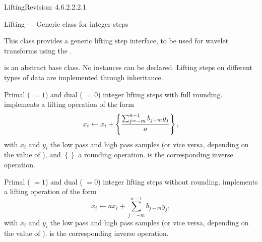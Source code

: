 \begin{manpage}{\libtitle}{Lifting}{$ $Revision: 4.6.2.2.2.1 $ $}

\subtitle{Name}
    Lifting --- Generic class for integer  steps


\subtitle{Description}
    This class provides a generic lifting step interface, to be used for
    wavelet transforms using the .


\subtitle{Declaration}

     is an abstract base class. No instances can be declared.
    Lifting steps on different types of data are implemented through
    inheritance.


\subtitle{Virtual \\ Operations}

    Primal ( $= 1$) and dual ( $= 0$) integer lifting
    steps with full rounding.  implements a lifting
    operation of the form
    \[ x_i \leftarrow x_i + \left\{ {\sum_{j=-m}^{n-1} b_{j+m} y_j \over a}
       \right\}, \]
    with $x_i$ and $y_i$ the low pass and high pass samples (or vice versa,
    depending on the value of ), and $\left\{\right\}$ a rounding
    operation.
     is the corresponding inverse operation.

    Primal ( $= 1$) and dual ( $= 0$) integer lifting
    steps without rounding.  implements a lifting
    operation of the form
    \[ x_i \leftarrow a x_i + \sum_{j=-m}^{n-1} b_{j+m} y_j, \]
    with $x_i$ and $y_i$ the low pass and high pass samples (or vice versa,
    depending on the value of ).
     is the corresponding inverse operation.


\end{manpage}
